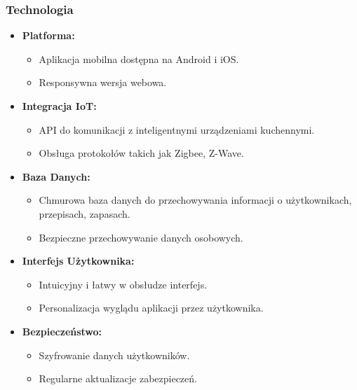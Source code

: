 \documentclass[a4paper,12pt]{article}
\begin{document}
    \subsubsection{Technologia}
    \begin{itemize}
        \item \textbf{Platforma:}
        \begin{itemize}
            \item Aplikacja mobilna dostępna na Android i iOS\@.
            \item Responsywna wersja webowa.
        \end{itemize}
        \item \textbf{Integracja IoT:}
        \begin{itemize}
            \item API do komunikacji z inteligentnymi urządzeniami kuchennymi.
            \item Obsługa protokołów takich jak Zigbee, Z-Wave.
        \end{itemize}
        \item \textbf{Baza Danych:}
        \begin{itemize}
            \item Chmurowa baza danych do przechowywania informacji o użytkownikach, przepisach, zapasach.
            \item Bezpieczne przechowywanie danych osobowych.
        \end{itemize}
        \item \textbf{Interfejs Użytkownika:}
        \begin{itemize}
            \item Intuicyjny i łatwy w obsłudze interfejs.
            \item Personalizacja wyglądu aplikacji przez użytkownika.
        \end{itemize}
        \item \textbf{Bezpieczeństwo:}
        \begin{itemize}
            \item Szyfrowanie danych użytkowników.
            \item Regularne aktualizacje zabezpieczeń.
        \end{itemize}
    \end{itemize}
\end{document}
